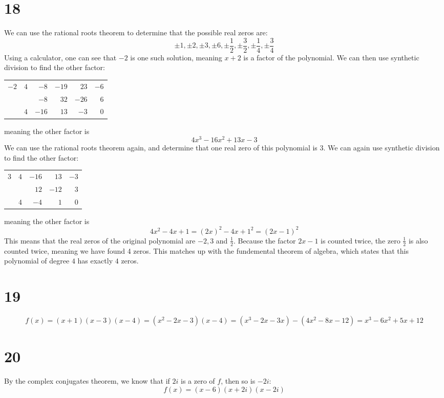 \documentclass{article}
\theoremstyle{definition}
\begin{document}
\section*{18}
We can use the rational roots theorem to determine that the possible real zeros are:
\[ \pm 1, \pm 2, \pm 3, \pm 6, \pm\frac{1}{2}, \pm\frac{3}{2}, \pm\frac{1}{4}, \pm\frac{3}{4} \]
Using a calculator, one can see that $-2$ is one such solution, meaning $x+2$ is a factor of the polynomial. We can then use synthetic division to find the 
other factor:
\begin{center}
\begin{tabular}{r|rrrrr}
        $-2$ & $4$ & $-8$ & $-19$ & $23$ & $-6$ \\
        & & $-8$ & $32$ & $-26$ & $6$ \\
        \cmidrule{2-6}
        & $4$ & $-16$ & $13$ & $-3$ & $0$
\end{tabular}
\end{center} 
meaning the other factor is \[ 4x^3-16x^2+13x-3 \] We can use the rational roots theorem again, and determine that one real zero of this polynomial 
is $3$. We can again use synthetic division to find the other factor:
\begin{center}
\begin{tabular}{r|rrrr}
        $3$ & $4$ & $-16$ & $13$ & $-3$ \\
        & & $12$ & $-12$ & $3$ \\
        \cmidrule{2-5}
        & $4$ & $-4$ & $1$ & $0$
\end{tabular}
\end{center}
meaning the other factor is \[ 4x^2-4x+1=(2x)^2-4x+1^2=(2x-1)^2 \] This means that the real zeros of the original polynomial are $-2,3$ and $\frac{1}{2}$. 
Because the factor $2x-1$ is counted twice, the zero $\frac{1}{2}$ is also counted twice, meaning we have found 4 zeros. This matches up with the 
fundemental theorem of algebra, which states that this polynomial of degree $4$ has exactly $4$ zeros.

\section*{19}
\[ f(x)=(x+1)(x-3)(x-4)=(x^2-2x-3)(x-4)=(x^3-2x-3x)-(4x^2-8x-12)=x^3-6x^2+5x+12 \]

\section*{20}
By the complex conjugates theorem, we know that if $2i$ is a zero of $f$, then so is $-2i$:
\[ f(x)=(x-6)(x+2i)(x-2i) \]
\end{document}
